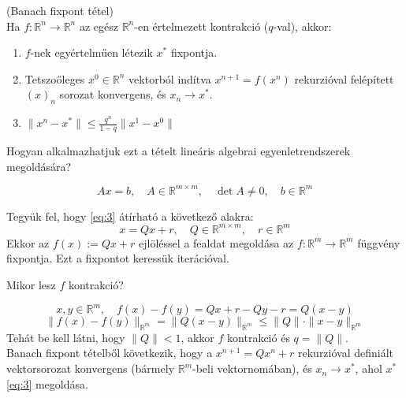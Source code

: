 \begin{tetel}(Banach fixpont tétel) \\
    Ha $f:\mathbb{R}^{n}\to \mathbb{R}^{n}$ az egész $\mathbb{R}^{n}$-en értelmezett kontrakció ($q$-val), akkor:
    \begin{enumerate}
        \item $f$-nek egyértelműen létezik $x^{*}$ fixpontja.
        \item Tetszoőleges $x^{0} \in \mathbb{R}^{n}$ vektorból indítva $x^{n+1} = f(x^{n})$ rekurzióval felépített $(x)_{n}$ sorozat konvergens, és $x_{n} \to x^{*}$.
        \item $\| x^{n} - x^{*} \| \leq \frac{q^{n}}{1-q} \| x^{1} - x^{0} \|$
    \end{enumerate}
\end{tetel}

\begin{kerdes}
    Hogyan alkalmazhatjuk ezt a tételt lineáris algebrai egyenletrendszerek megoldására?
\end{kerdes}

\begin{equation}\label{eq:3}
    Ax = b, \quad A\in\mathbb{R}^{m\times m}, \quad \det A \neq 0, \quad b \in \mathbb{R}^{m}
\end{equation}

Tegyük fel, hogy \ref{eq:3} átírható a következő alakra:
\begin{equation}\label{eq:4}
    x = Qx + r, \quad Q \in \mathbb{R}^{m\times m}, \quad r \in \mathbb{R}^{m}
\end{equation}
Ekkor az $f(x) := Qx + r$ ejlöléssel a fealdat megoldása az $f:\mathbb{R}^{m}\to \mathbb{R}^{m}$ függvény fixpontja. Ezt a fixpontot keressük iterációval.

\begin{kerdes}
    Mikor lesz $f$ kontrakció?
\end{kerdes}
\begin{equation*}
    x, y \in \mathbb{R}^{m}, \quad f(x) - f(y) = Qx + r - Qy - r = Q(x -y)
\end{equation*}
\begin{equation*}
    \| f(x) - f(y) \| _{\mathbb{R}^{m}} = \| Q(x-y) \| _{\mathbb{R}^{m}} \leq \| Q \| \cdot \| x-y \| _{\mathbb{R}^{m}} 
\end{equation*}
Tehát be kell látni, hogy $\| Q \| < 1$, akkor $f$ kontrakció és $q = \| Q \|$. \\
Banach fixpont tételből következik, hogy a $x^{n+1} = Qx^{n} + r$ rekurzióval definiált vektorsorozat konvergens (bármely $\mathbb{R}^{m}$-beli vektornomában), és $x_{n}\to x^{*}$, ahol $x^{*}$ \ref{eq:3} megoldása.

